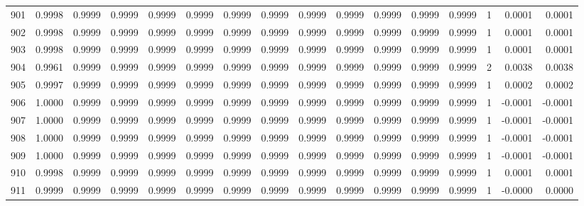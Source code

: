 \begin{tabular}{lrrrrrrrrrrrrrrr}
901 &      0.9998 &  0.9999 &  0.9999 &  0.9999 &  0.9999 &  0.9999 &  0.9999 &  0.9999 &  0.9999 &  0.9999 &   0.9999 &     0.9999 &      1 &                    0.0001 &                     0.0001 \\
902 &      0.9998 &  0.9999 &  0.9999 &  0.9999 &  0.9999 &  0.9999 &  0.9999 &  0.9999 &  0.9999 &  0.9999 &   0.9999 &     0.9999 &      1 &                    0.0001 &                     0.0001 \\
903 &      0.9998 &  0.9999 &  0.9999 &  0.9999 &  0.9999 &  0.9999 &  0.9999 &  0.9999 &  0.9999 &  0.9999 &   0.9999 &     0.9999 &      1 &                    0.0001 &                     0.0001 \\
904 &      0.9961 &  0.9999 &  0.9999 &  0.9999 &  0.9999 &  0.9999 &  0.9999 &  0.9999 &  0.9999 &  0.9999 &   0.9999 &     0.9999 &      2 &                    0.0038 &                     0.0038 \\
905 &      0.9997 &  0.9999 &  0.9999 &  0.9999 &  0.9999 &  0.9999 &  0.9999 &  0.9999 &  0.9999 &  0.9999 &   0.9999 &     0.9999 &      1 &                    0.0002 &                     0.0002 \\
906 &      1.0000 &  0.9999 &  0.9999 &  0.9999 &  0.9999 &  0.9999 &  0.9999 &  0.9999 &  0.9999 &  0.9999 &   0.9999 &     0.9999 &      1 &                   -0.0001 &                    -0.0001 \\
907 &      1.0000 &  0.9999 &  0.9999 &  0.9999 &  0.9999 &  0.9999 &  0.9999 &  0.9999 &  0.9999 &  0.9999 &   0.9999 &     0.9999 &      1 &                   -0.0001 &                    -0.0001 \\
908 &      1.0000 &  0.9999 &  0.9999 &  0.9999 &  0.9999 &  0.9999 &  0.9999 &  0.9999 &  0.9999 &  0.9999 &   0.9999 &     0.9999 &      1 &                   -0.0001 &                    -0.0001 \\
909 &      1.0000 &  0.9999 &  0.9999 &  0.9999 &  0.9999 &  0.9999 &  0.9999 &  0.9999 &  0.9999 &  0.9999 &   0.9999 &     0.9999 &      1 &                   -0.0001 &                    -0.0001 \\
910 &      0.9998 &  0.9999 &  0.9999 &  0.9999 &  0.9999 &  0.9999 &  0.9999 &  0.9999 &  0.9999 &  0.9999 &   0.9999 &     0.9999 &      1 &                    0.0001 &                     0.0001 \\
911 &      0.9999 &  0.9999 &  0.9999 &  0.9999 &  0.9999 &  0.9999 &  0.9999 &  0.9999 &  0.9999 &  0.9999 &   0.9999 &     0.9999 &      1 &                   -0.0000 &                     0.0000 \\

\end{tabular}
